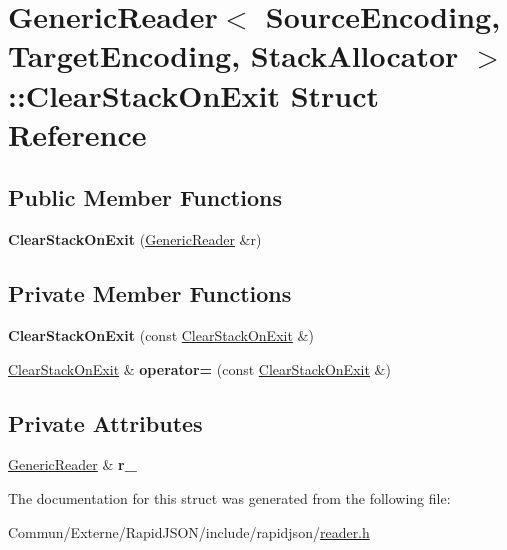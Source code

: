 \hypertarget{struct_generic_reader_1_1_clear_stack_on_exit}{}\section{Generic\+Reader$<$ Source\+Encoding, Target\+Encoding, Stack\+Allocator $>$\+:\+:Clear\+Stack\+On\+Exit Struct Reference}
\label{struct_generic_reader_1_1_clear_stack_on_exit}
\subsection*{Public Member Functions}
\begin{DoxyCompactItemize}
\item 
{\bfseries Clear\+Stack\+On\+Exit} (\hyperlink{class_generic_reader}{Generic\+Reader} \&r)\hypertarget{struct_generic_reader_1_1_clear_stack_on_exit_a74f8b1f772229a3b2eb1d26ba4b58eca}{}\label{struct_generic_reader_1_1_clear_stack_on_exit_a74f8b1f772229a3b2eb1d26ba4b58eca}

\end{DoxyCompactItemize}
\subsection*{Private Member Functions}
\begin{DoxyCompactItemize}
\item 
{\bfseries Clear\+Stack\+On\+Exit} (const \hyperlink{struct_generic_reader_1_1_clear_stack_on_exit}{Clear\+Stack\+On\+Exit} \&)\hypertarget{struct_generic_reader_1_1_clear_stack_on_exit_ab276cf5b396da397f4ec05d6a29139a9}{}\label{struct_generic_reader_1_1_clear_stack_on_exit_ab276cf5b396da397f4ec05d6a29139a9}

\item 
\hyperlink{struct_generic_reader_1_1_clear_stack_on_exit}{Clear\+Stack\+On\+Exit} \& {\bfseries operator=} (const \hyperlink{struct_generic_reader_1_1_clear_stack_on_exit}{Clear\+Stack\+On\+Exit} \&)\hypertarget{struct_generic_reader_1_1_clear_stack_on_exit_acf3f83e842ebbe256c86d52e36a044c3}{}\label{struct_generic_reader_1_1_clear_stack_on_exit_acf3f83e842ebbe256c86d52e36a044c3}

\end{DoxyCompactItemize}
\subsection*{Private Attributes}
\begin{DoxyCompactItemize}
\item 
\hyperlink{class_generic_reader}{Generic\+Reader} \& {\bfseries r\+\_\+}\hypertarget{struct_generic_reader_1_1_clear_stack_on_exit_a6805ebb172f278c65ec7fc61847eb08d}{}\label{struct_generic_reader_1_1_clear_stack_on_exit_a6805ebb172f278c65ec7fc61847eb08d}

\end{DoxyCompactItemize}


The documentation for this struct was generated from the following file\+:\begin{DoxyCompactItemize}
\item 
Commun/\+Externe/\+Rapid\+J\+S\+O\+N/include/rapidjson/\hyperlink{reader_8h}{reader.\+h}\end{DoxyCompactItemize}
